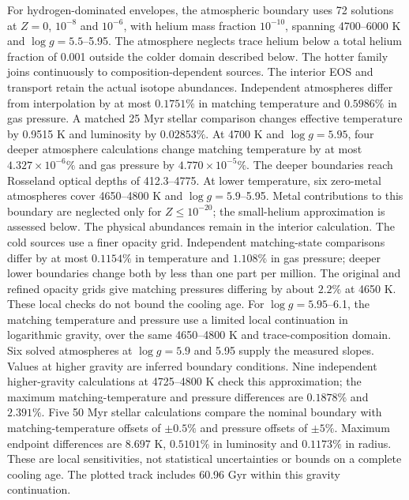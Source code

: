 \documentclass[11pt,letterpaper]{article}
\begin{document}
For hydrogen-dominated envelopes, the atmospheric boundary uses 72
solutions at $Z=0$, $10^{-8}$ and $10^{-6}$, with helium mass fraction
$10^{-10}$, spanning 4700--6000 K and $\log g=5.5$--5.95.
The atmosphere neglects trace helium below a total helium fraction of
0.001 outside the colder domain described below. The hotter family
joins continuously to composition-dependent sources. The interior EOS and transport retain
the actual isotope abundances. Independent atmospheres differ from
interpolation by at most $0.1751\%$ in matching temperature and $0.5986\%$
in gas pressure. A matched 25 Myr stellar comparison changes effective
temperature by 0.9515 K and luminosity by $0.02853\%$.
At 4700 K and $\log g=5.95$, four deeper atmosphere calculations
change matching temperature by at most $4.327\times10^{-6}\%$ and
gas pressure by $4.770\times10^{-5}\%$. The deeper boundaries reach
Rosseland optical depths of 412.3--4775.
At lower temperature, six zero-metal atmospheres cover 4650--4800 K
and $\log g=5.9$--5.95. Metal contributions to this boundary are neglected
only for $Z\leq10^{-20}$; the small-helium approximation is assessed
below. The
physical abundances remain in the interior calculation. The cold sources
use a finer opacity grid. Independent matching-state comparisons differ
by at most $0.1154\%$ in temperature and $1.108\%$ in gas pressure;
deeper lower boundaries change both by less than one part per million.
The original and refined opacity grids give matching pressures differing
by about $2.2\%$ at 4650 K. These local checks do not bound the cooling age.
For $\log g=5.95$--6.1, the matching temperature and pressure use a
limited local continuation in logarithmic gravity, over the same
4650--4800 K and trace-composition domain. Six solved atmospheres at
$\log g=5.9$ and 5.95 supply the measured slopes. Values at higher gravity
are inferred boundary conditions. Nine independent higher-gravity
calculations at 4725--4800 K check this approximation; the maximum
matching-temperature and pressure differences are $0.1878\%$ and
$2.391\%$. Five 50 Myr stellar calculations compare the nominal boundary
with matching-temperature offsets of $\pm0.5\%$ and pressure offsets
of $\pm5\%$. Maximum endpoint differences are 8.697 K,
$0.5101\%$ in luminosity and $0.1173\%$ in radius.
These are local sensitivities, not statistical uncertainties or bounds
on a complete cooling age. The plotted track includes 60.96 Gyr within
this gravity continuation.
\end{document}
